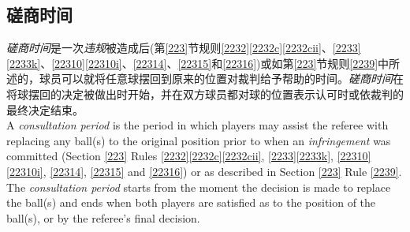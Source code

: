 \subsection{磋商时间}

\noindent \emph{磋商时间}是一次\emph{违规}被造成后(第\ref{223}节规则\ref{2232}\ref{2232c}\ref{2232cii}、\ref{2233}\ref{2233k}、\ref{22310}\ref{22310i}、\ref{22314}、\ref{22315}和\ref{22316})或如第\ref{223}节规则\ref{2239}中所述的，球员可以就将任意球摆回到原来的位置对裁判给予帮助的时间。\emph{磋商时间}在将球摆回的决定被做出时开始，并在双方球员都对球的位置表示认可时或依裁判的最终决定结束。\\
A \emph{consultation period} is the period in which players may assist the referee with replacing any ball(s) to the original position prior to when an \emph{infringement} was committed (Section \ref{223} Rules \ref{2232}\ref{2232c}\ref{2232cii}, \ref{2233}\ref{2233k}, \ref{22310}\ref{22310i}, \ref{22314}, \ref{22315} and \ref{22316}) or as described in Section \ref{223} Rule \ref{2239}. The \emph{consultation period} starts from the moment the decision is made to replace the ball(s) and ends when both players are satisfied as to the position of the ball(s), or by the referee's final decision. 
